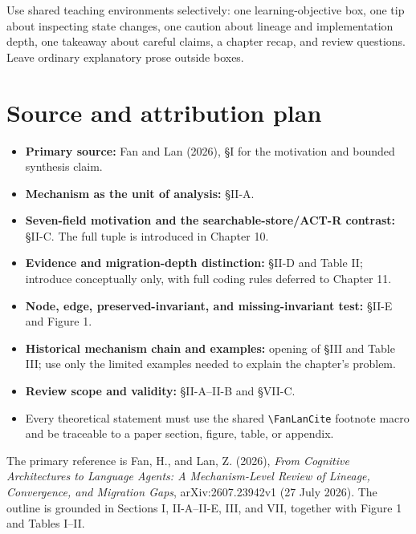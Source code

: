Use shared teaching environments selectively: one learning-objective box, one tip about inspecting state changes, one caution about lineage and implementation depth, one takeaway about careful claims, a chapter recap, and review questions. Leave ordinary explanatory prose outside boxes.

\section{Source and attribution plan}
\begin{itemize}
  \item \textbf{Primary source:} Fan and Lan (2026), \S I for the motivation and bounded synthesis claim.
  \item \textbf{Mechanism as the unit of analysis:} \S II-A.
  \item \textbf{Seven-field motivation and the searchable-store/ACT-R contrast:} \S II-C. The full tuple is introduced in Chapter 10.
  \item \textbf{Evidence and migration-depth distinction:} \S II-D and Table II; introduce conceptually only, with full coding rules deferred to Chapter 11.
  \item \textbf{Node, edge, preserved-invariant, and missing-invariant test:} \S II-E and Figure 1.
  \item \textbf{Historical mechanism chain and examples:} opening of \S III and Table III; use only the limited examples needed to explain the chapter's problem.
  \item \textbf{Review scope and validity:} \S II-A--II-B and \S VII-C.
  \item Every theoretical statement must use the shared \texttt{\textbackslash FanLanCite} footnote macro and be traceable to a paper section, figure, table, or appendix.
\end{itemize}


The primary reference is Fan, H., and Lan, Z. (2026), \emph{From Cognitive Architectures to Language Agents: A Mechanism-Level Review of Lineage, Convergence, and Migration Gaps}, arXiv:2607.23942v1 (27 July 2026). The outline is grounded in Sections I, II-A--II-E, III, and VII, together with Figure 1 and Tables I--II.

